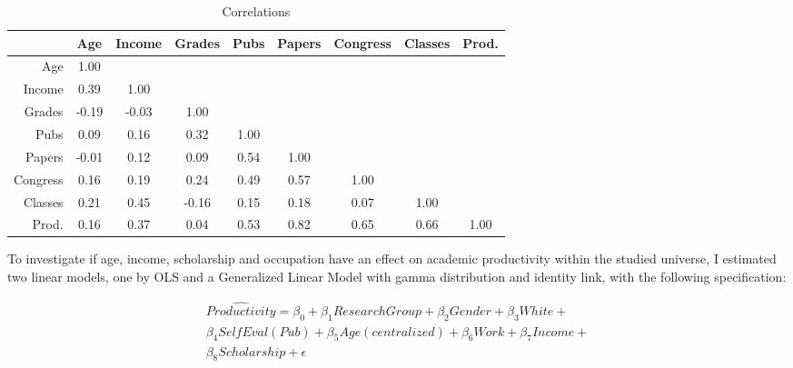 \documentclass[compress]{beamer}
\begin{document}
\begin{frame}
	\begin{table}[ht]
			\centering
			\scriptsize
			\caption{Correlations}
			\label{correlations}
		
		\begin{tabular}{r|cccccccc}
				\hline
				& Age & Income & Grades & Pubs & Papers & Congress & Classes & Prod. \\ 
				\hline
				Age & 1.00 &  &  &  &  &  &  &  \\ 
				Income & 0.39 & 1.00 &  &  &  &  &  &  \\ 
				Grades & -0.19 & -0.03 & 1.00 &  &  &  &  &  \\ 
				Pubs & 0.09 & 0.16 & 0.32 & 1.00 &  &  &  &  \\ 
				Papers & -0.01 & 0.12 & 0.09 & 0.54 & 1.00 &  &  &  \\ 
				Congress & 0.16 & 0.19 & 0.24 & 0.49 & 0.57 & 1.00 &  &  \\ 
				Classes & 0.21 & 0.45 & -0.16 & 0.15 & 0.18 & 0.07 & 1.00 &  \\ 
				Prod. & 0.16 & 0.37 & 0.04 & 0.53 & 0.82 & 0.65 & 0.66 & 1.00 \\ 
				\hline
			\end{tabular}
		
	\end{table}
\end{frame}

\begin{frame}
\justify
To investigate if age, income, scholarship and occupation have an effect on academic productivity within the studied universe, I estimated two linear models, one by OLS and a Generalized Linear Model with gamma distribution and identity link, with the following specification:

\begin{multline}
\label{linear}
\widehat{Productivity} = \beta_0 + \beta_1ResearchGroup + \beta_2Gender + \beta_3White + \\ \beta_4Self Eval(Pub) + \beta_5Age(centralized) + \beta_6Work + \beta_7Income + \\ \beta_8Scholarship + \epsilon
\end{multline}

\end{frame}
\end{document}
